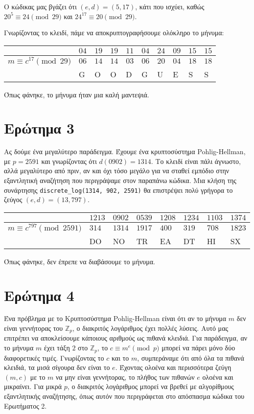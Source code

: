 \documentclass{article}
\begin{document}
Ο κώδικας μας βγάζει ότι $(e, d) = (5, 17)$, κάτι που ισχύει, καθώς $20^5 \equiv 24 \pmod{29}$ και $24^{17} \equiv 20 \pmod{29}$.

Γνωρίζοντας το κλειδί, πάμε να αποκρυπτογραφήσουμε ολόκληρο το μήνυμα:

\begin{longtable}[c]{|l|l|l|l|l|l|l|l|l|l|}
\hline
& $04$ & $19$ & $19$ & $11$ & $04$ & $24$ & $09$ & $15$ & $15$ \\
\hline
$m \equiv c^{17} \pmod{29}$ & $06$ & $14$ & $14$ & $03$ & $06$ & $20$ & $04$ & $18$ & $18$ \\
\hline
& G & O & O & D & G & U & E & S & S \\
\hline
\end{longtable}

Όπως φάνηκε, το μήνυμα ήταν μια καλή μαντεψιά.

\section*{Ερώτημα 3}

Ας δούμε ένα μεγαλύτερο παράδειγμα. Έχουμε ένα κρυπτοσύστημα Pohlig-Hellman, με $p = 2591$ και γνωρίζοντας ότι $d(0902) = 1314$. Το κλειδί είναι πάλι άγνωστο, αλλά μεγαλύτερο από πριν, αν και όχι τόσο μεγάλο για να σταθεί εμπόδιο στην εξαντλητική αναζήτηση που περιγράψαμε στον παραπάνω κώδικα. Μια κλήση της συνάρτησης \lstinline|discrete_log(1314, 902, 2591)| θα επιστρέψει πολύ γρήγορα το ζεύγος $(e, d) = (13, 797)$. 

\begin{longtable}[c]{|l|l|l|l|l|l|l|l|}
\hline
& $1213$ & $0902$ & $0539$ & $1208$ & $1234$ & $1103$ & $1374$ \\
\hline
$m \equiv c^{797} \pmod{2591}$ & $314$ & $1314$ & $1917$ & $400$ & $319$ & $708$ & $1823$ \\
\hline
& DO & NO & TR & EA & DT & HI & SX \\
\hline
\end{longtable}

Όπως φάνηκε, δεν έπρεπε να διαβάσουμε το μήνυμα.

\section*{Ερώτημα 4}

Ένα πρόβλημα με το Κρυπτοσύστημα Pohlig-Hellman είναι ότι αν το μήνυμα $m$ δεν είναι γεννήτορας του $\mathbb{Z}_p$, ο διακριτός λογάριθμος έχει πολλές λύσεις. Αυτό μας επιτρέπει να αποκλείσουμε κάποιους αριθμούς ως πιθανά κλειδιά. Για παράδειγμα, αν το μήνυμα $m$ έχει τάξη $2$ στο $\mathbb{Z}_p$, το $c \equiv m^e \pmod p$ μπορεί να πάρει μόνο δύο διαφορετικές τιμές. Γνωρίζοντας το $c$ και το $m$, συμπεράναμε ότι από όλα τα πιθανά κλειδιά, τα μισά σίγουρα δεν είναι το $e$. Έχοντας ολοένα και περισσότερα ζεύγη $(m, c)$ με το $m$ να μην είναι γεννήτορας, το πλήθος των πιθανών $e$ ολοένα και μικραίνει. Για μικρά $p$, ο διακριτός λογάριθμος μπορεί να βρεθεί με αλγορίθμους εξαντλητικής αναζήτησης, όπως αυτόν που περιγράφεται στο απόσπασμα κώδικα του Ερωτήματος 2.
\end{document}

